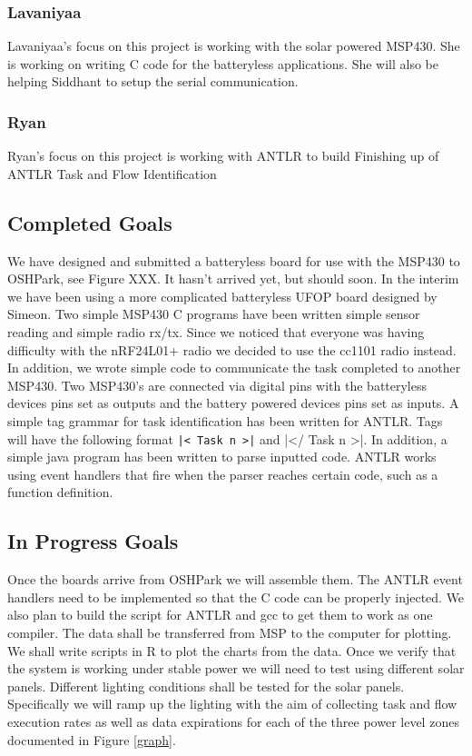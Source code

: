 \subsubsection{Lavaniyaa}
Lavaniyaa's focus on this project is working with the solar powered MSP430.
She is working on writing C code for the batteryless applications.
She will also be helping Siddhant to setup the serial communication.

\subsubsection{Ryan}
Ryan's focus on this project is working with ANTLR to build
Finishing up of ANTLR Task and Flow Identification

\subsection{Completed Goals}

We have designed and submitted a batteryless board for use with the MSP430 to OSHPark, see Figure XXX.
It hasn't arrived yet, but should soon.
In the interim we have been using a more complicated batteryless UFOP board designed by Simeon.
Two simple MSP430 C programs have been written simple sensor reading and simple radio rx/tx.
Since we noticed that everyone was having difficulty with the nRF24L01+ radio we decided to use the cc1101 radio instead.
In addition, we wrote simple code to communicate the task completed to another MSP430.
Two MSP430's are connected via digital pins with the batteryless devices pins set as outputs and the battery powered devices pins set as inputs.
A simple tag grammar for task identification has been written for ANTLR.
Tags will have the following format {\tt |< Task n >|} and |</ Task n >|.
In addition, a simple java program has been written to parse inputted code.
ANTLR works using event handlers that fire when the parser reaches certain code, such as a function definition.

\subsection{In Progress Goals}


Once the boards arrive from OSHPark we will assemble them.
The ANTLR event handlers need to be implemented so that the C code can be properly injected.
We also plan to build the script for ANTLR and gcc to get them to work as one compiler.
The data shall be transferred from MSP to the computer for plotting.
We shall write scripts in R to plot the charts from the data.
Once we verify that the system is working under stable power we will need to test using different solar panels.
Different lighting conditions shall be tested for the solar panels.
Specifically we will ramp up the lighting with the aim of collecting task and flow execution rates as well as data expirations for each of the three power level zones documented in Figure \ref{graph}.


